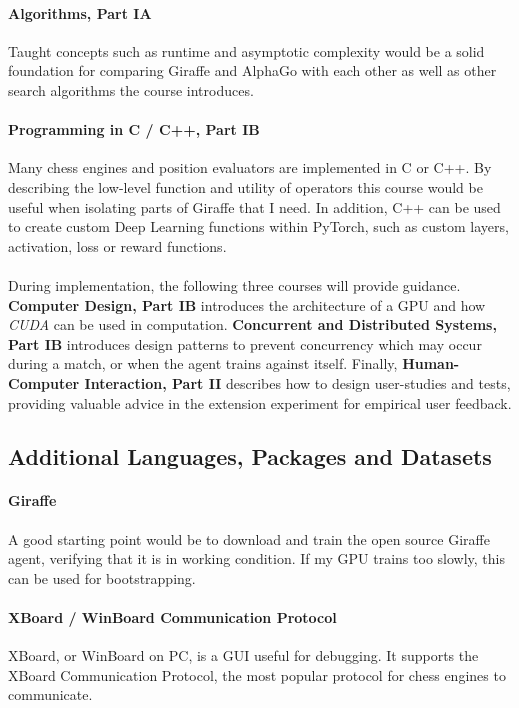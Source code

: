 \documentclass[a4paper]{article}
\begin{document}
\paragraph{Algorithms, Part IA} Taught concepts such as runtime and asymptotic complexity would be a solid foundation for comparing Giraffe and AlphaGo with each other as well as other search algorithms the course introduces.

\paragraph{Programming in C / C++, Part IB} Many chess engines and position evaluators are implemented in C or C++. By describing the low-level function and utility of operators this course would be useful when isolating parts of Giraffe that I need. In addition, C++ can be used to create custom Deep Learning functions within PyTorch, such as custom layers, activation, loss or reward functions.

\paragraph{} During implementation, the following three courses will provide guidance. \textbf{Computer Design, Part IB} introduces the architecture of a GPU and how \textit{CUDA} can be used in computation. \textbf{Concurrent and Distributed Systems, Part IB} introduces design patterns to prevent concurrency which may occur during a match, or when the agent trains against itself. Finally, \textbf{Human-Computer Interaction, Part II} describes how to design user-studies and tests, providing valuable advice in the extension experiment for empirical user feedback.


\subsection*{Additional Languages, Packages and Datasets}

\paragraph{Giraffe} A good starting point would be to download and train the open source Giraffe agent, verifying that it is in working condition. If my GPU trains too slowly, this can be used for bootstrapping.

\paragraph{XBoard / WinBoard Communication Protocol} XBoard, or WinBoard on PC, is a GUI useful for debugging. It supports the XBoard Communication Protocol, the most popular protocol for chess engines to communicate.
\end{document}
